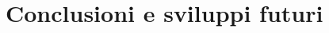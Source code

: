 \documentclass[12pt,a4paper]{report}
\begin{document}



\chapter{Conclusioni e sviluppi futuri}\label{ch:conc-svil-fut}
\lipsum[29-30]





\end{document}
